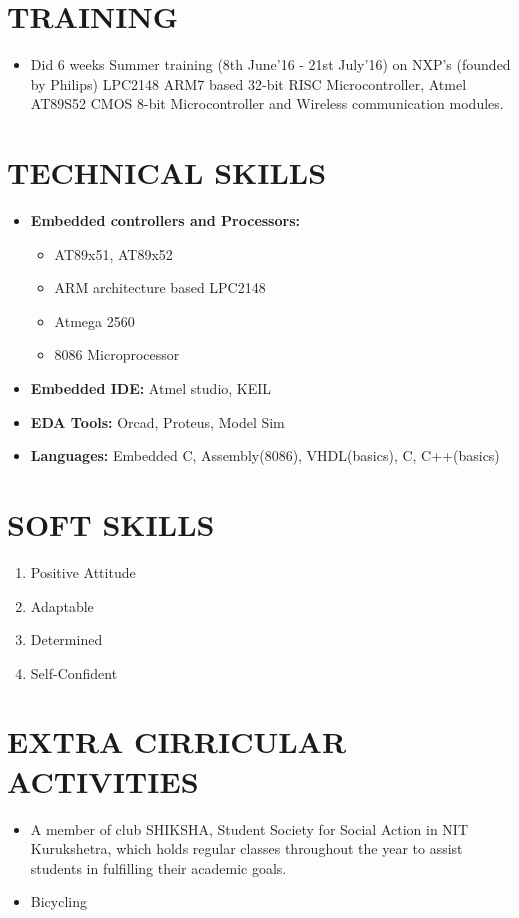 \documentclass[a4paper]{article}
\begin{document}
\begin{Large}
\section*{\textbf{TRAINING}}
\begin{itemize}
\item Did 6 weeks Summer training (8th June'16 - 21st July'16) on NXP's (founded by Philips) LPC2148 ARM7 based 32-bit RISC Microcontroller, Atmel AT89S52 CMOS 8-bit Microcontroller and Wireless communication modules.  
\end{itemize}

\section*{\textbf{TECHNICAL SKILLS}}
\begin{itemize}
\item \textbf{Embedded controllers and Processors:}
   \begin{itemize}
      \item AT89x51, AT89x52
      \item ARM architecture based LPC2148
      \item Atmega 2560
      \item 8086 Microprocessor
   \end{itemize}
\item \textbf{Embedded IDE:} Atmel studio, KEIL 
\item \textbf{EDA Tools:} Orcad, Proteus, Model Sim
\item \textbf{Languages:} Embedded C, Assembly(8086), VHDL(basics), C, C++(basics)
\end{itemize}


\section*{\textbf{SOFT SKILLS}}
\begin{enumerate}
\item Positive Attitude
\item Adaptable
\item Determined
\item Self-Confident
\end{enumerate}

\section*{\textbf{EXTRA CIRRICULAR ACTIVITIES}}
\begin{itemize}
\item A member of club SHIKSHA, Student Society for Social Action in NIT Kurukshetra, which holds regular classes throughout the year to assist students in fulfilling their academic goals. 
\item Bicycling
\end{itemize} 


\end{Large}
\end{document}
